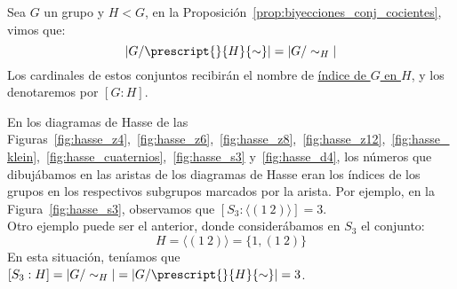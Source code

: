 \begin{definicion}
    Sea $G$ un grupo y $H<G$, en la Proposición~\ref{prop:biyecciones_conj_cocientes}, vimos que:
    \begin{equation*}
        |G/\prescript{}{H}{\sim}| = |G/\sim_H|
    \end{equation*}
    Los cardinales de estos conjuntos recibirán el nombre de \underline{índice de $G$ en $H$}, y los denotaremos por $[G:H]$.
\end{definicion}

\begin{ejemplo}
    En los diagramas de Hasse de las Figuras~\ref{fig:hasse_z4},~\ref{fig:hasse_z6},~\ref{fig:hasse_z8},~\ref{fig:hasse_z12},~\ref{fig:hasse_klein},~\ref{fig:hasse_cuaternios},~\ref{fig:hasse_s3} y~\ref{fig:hasse_d4}, los números que dibujábamos en las aristas de los diagramas de Hasse eran los índices de los grupos en los respectivos subgrupos marcados por la arista. Por ejemplo, en la Figura~\ref{fig:hasse_s3}, observamos que $[S_3:\langle (1\ 2) \rangle ] = 3$.\\

    Otro ejemplo puede ser el anterior, donde considerábamos en $S_3$ el conjunto:
    \begin{equation*}
        H = \langle (1\ 2) \rangle  = \{1, (1\ 2)\}
    \end{equation*}
    En esta situación, teníamos que $[S_3:H] = |G/\sim_H| = |G/\prescript{}{H}{\sim}| = 3$.
\end{ejemplo}

